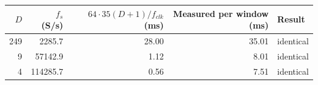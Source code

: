 \begin{tabular}{@{}rrrrl@{}}
\toprule
$D$ & $f_s$ (S/s) & $64\cdot35(D{+}1)/f_{clk}$ (ms) & Measured per window (ms) & Result \\
\midrule
249 & 2285.7 & 28.00 & 35.01 & identical \\
9 & 57142.9 & 1.12 & 8.01 & identical \\
4 & 114285.7 & 0.56 & 7.51 & identical \\
\bottomrule
\end{tabular}
